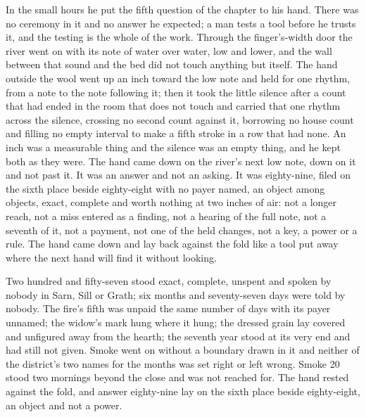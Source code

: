 \scenebreak

In the small hours he put the fifth question of the chapter to his hand. There was no ceremony in it and no answer he expected; a man tests a tool before he trusts it, and the testing is the whole of the work. Through the finger's-width door the river went on with its note of water over water, low and lower, and the wall between that sound and the bed did not touch anything but itself. The hand outside the wool went up an inch toward the low note and held for one rhythm, from a note to the note following it; then it took the little silence after a count that had ended in the room that does not touch and carried that one rhythm across the silence, crossing no second count against it, borrowing no house count and filling no empty interval to make a fifth stroke in a row that had none. An inch was a measurable thing and the silence was an empty thing, and he kept both as they were. The hand came down on the river's next low note, down on it and not past it. It was an answer and not an asking. It was eighty-nine, filed on the sixth place beside eighty-eight with no payer named, an object among objects, exact, complete and worth nothing at two inches of air: not a longer reach, not a miss entered as a finding, not a hearing of the full note, not a seventh of it, not a payment, not one of the held changes, not a key, a power or a rule. The hand came down and lay back against the fold like a tool put away where the next hand will find it without looking.

Two hundred and fifty-seven stood exact, complete, unspent and spoken by nobody in Sarn, Sill or Grath; six months and seventy-seven days were told by nobody. The fire's fifth was unpaid the same number of days with its payer unnamed; the widow's mark hung where it hung; the dressed grain lay covered and unfigured away from the hearth; the seventh year stood at its very end and had still not given. Smoke went on without a boundary drawn in it and neither of the district's two names for the months was set right or left wrong. Smoke 20 stood two mornings beyond the close and was not reached for. The hand rested against the fold, and answer eighty-nine lay on the sixth place beside eighty-eight, an object and not a power.
